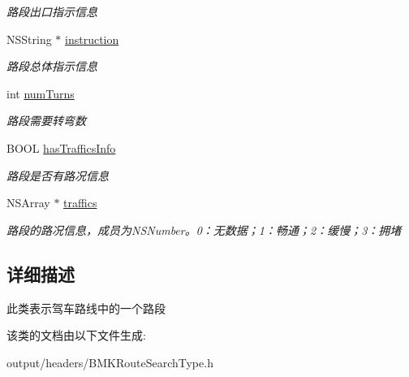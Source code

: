 \begin{DoxyCompactItemize}
\begin{DoxyCompactList}\small\item\em 路段出口指示信息 \end{DoxyCompactList}\item 
\hypertarget{interface_b_m_k_driving_step_a70a35973fdc204236c21d44770014989}{}N\+S\+String $\ast$ \hyperlink{interface_b_m_k_driving_step_a70a35973fdc204236c21d44770014989}{instruction}\label{interface_b_m_k_driving_step_a70a35973fdc204236c21d44770014989}

\begin{DoxyCompactList}\small\item\em 路段总体指示信息 \end{DoxyCompactList}\item 
\hypertarget{interface_b_m_k_driving_step_a261507960f7fcf3b6981e9a31667f47c}{}int \hyperlink{interface_b_m_k_driving_step_a261507960f7fcf3b6981e9a31667f47c}{num\+Turns}\label{interface_b_m_k_driving_step_a261507960f7fcf3b6981e9a31667f47c}

\begin{DoxyCompactList}\small\item\em 路段需要转弯数 \end{DoxyCompactList}\item 
\hypertarget{interface_b_m_k_driving_step_a1cfd822349a36e1c6e41fb08f5d7ff2f}{}B\+O\+O\+L \hyperlink{interface_b_m_k_driving_step_a1cfd822349a36e1c6e41fb08f5d7ff2f}{has\+Traffics\+Info}\label{interface_b_m_k_driving_step_a1cfd822349a36e1c6e41fb08f5d7ff2f}

\begin{DoxyCompactList}\small\item\em 路段是否有路况信息 \end{DoxyCompactList}\item 
\hypertarget{interface_b_m_k_driving_step_a7bf129fb86628f3c95fe39a268874a74}{}N\+S\+Array $\ast$ \hyperlink{interface_b_m_k_driving_step_a7bf129fb86628f3c95fe39a268874a74}{traffics}\label{interface_b_m_k_driving_step_a7bf129fb86628f3c95fe39a268874a74}

\begin{DoxyCompactList}\small\item\em 路段的路况信息，成员为\+N\+S\+Number。0：无数据；1：畅通；2：缓慢；3：拥堵 \end{DoxyCompactList}\end{DoxyCompactItemize}


\subsection{详细描述}
此类表示驾车路线中的一个路段 

该类的文档由以下文件生成\+:\begin{DoxyCompactItemize}
\item 
output/headers/B\+M\+K\+Route\+Search\+Type.\+h\end{DoxyCompactItemize}
